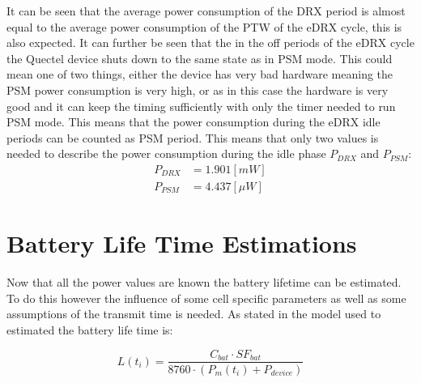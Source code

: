 It can be seen that the average power consumption of the DRX period is almost equal to the average power consumption of the PTW of the eDRX cycle, this is also expected. It can further be seen that the in the off periods of the eDRX cycle the Quectel device shuts down to the same state as in PSM mode. This could  mean one of two things, either the device has very bad hardware meaning the PSM power consumption is very high, or as in this case the hardware is very good and it can keep the timing sufficiently with only the timer needed to run PSM mode. This means that the power consumption during the eDRX idle periods can be counted as PSM period. This means that only two values is needed to describe the power consumption during the idle phase $P_{DRX}$ and $P_{PSM}$:
\begin{align}
P_{DRX} &= 1.901 [mW] \\
P_{PSM} &= 4.437 [\mu W]
\end{align}


\section{Battery Life Time Estimations}

Now that all the power values are known the battery lifetime can be estimated. To do this however the influence of some cell specific parameters as well as some assumptions of the transmit time is needed. As stated in  the model used to estimated the battery life time is:

\begin{equation}
L(t_i) = \frac{C_{bat}\cdot SF_{bat}}{8760\cdot (P_m(t_i) + P_{device})}
\end{equation}
\begin{where}
\end{where}


